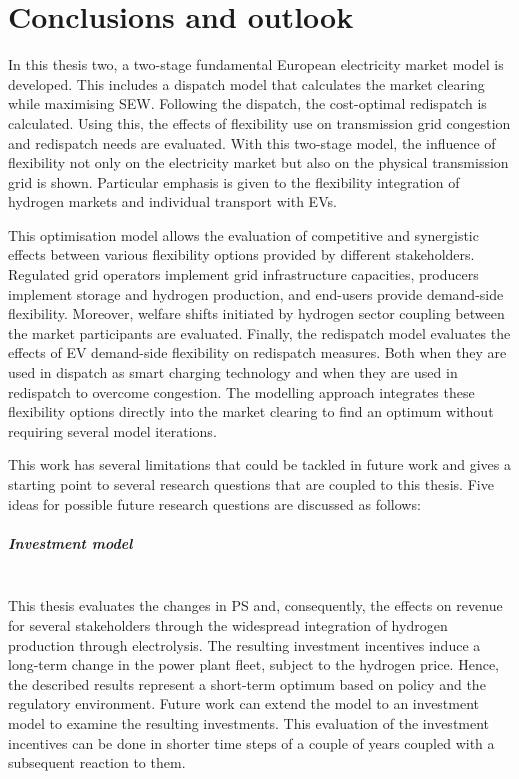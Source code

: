 \chapter{Conclusions and outlook}\label{conclusions}
In this thesis two, a two-stage fundamental European electricity market model is developed. This includes a dispatch model that calculates the market clearing while maximising \ac{SEW}. Following the dispatch, the cost-optimal redispatch is calculated. Using this, the effects of flexibility use on transmission grid congestion and redispatch needs are evaluated. With this two-stage model, the influence of flexibility not only on the electricity market but also on the physical transmission grid is shown. Particular emphasis is given to the flexibility integration of hydrogen markets and individual transport with \ac{EV}s. 


This optimisation model allows the evaluation of competitive and synergistic effects between various flexibility options provided by different stakeholders. Regulated grid operators implement grid infrastructure capacities, producers implement storage and hydrogen production, and end-users provide demand-side flexibility. Moreover, welfare shifts initiated by hydrogen sector coupling between the market participants are evaluated. Finally, the redispatch model evaluates the effects of \ac{EV} demand-side flexibility on redispatch measures. Both when they are used in dispatch as smart charging technology and when they are used in redispatch to overcome congestion. The modelling approach integrates these flexibility options directly into the market clearing to find an optimum without requiring several model iterations.


This work has several limitations that could be tackled in future work and gives a starting point to several research questions that are coupled to this thesis. Five ideas for possible future research questions are discussed as follows:

\paragraph*{Investment model}\mbox{}\\
This thesis evaluates the changes in \ac{PS} and, consequently, the effects on revenue for several stakeholders through the widespread integration of hydrogen production through electrolysis. The resulting investment incentives induce a long-term change in the power plant fleet, subject to the hydrogen price. Hence, the described results represent a short-term optimum based on policy and the regulatory environment. Future work can extend the model to an investment model to examine the resulting investments. This evaluation of the investment incentives can be done in shorter time steps of a couple of years coupled with a subsequent reaction to them. 



